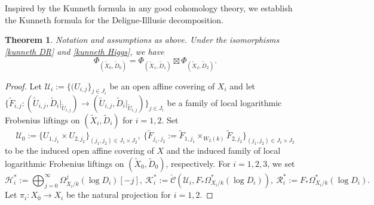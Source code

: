 \documentclass[12pt, a4paper]{article}
\newtheorem{theorem}{Theorem}[section]
\begin{document}
Inspired by the Kunneth formula in any good cohomology theory, we establish the Kunneth formula for the Deligne-Illlusie decomposition. 
\begin{theorem}
Notation and assumptions as above. Under the isomorphisms \eqref{kunneth DR} and \eqref{kunneth Higgs}, we have
$$
\Phi_{(\tilde X_0,\tilde D_0)}=\Phi_{(\tilde X_1,\tilde D_1)}\boxtimes\Phi_{(\tilde X_2,\tilde D_2)}.
$$
\end{theorem}
\begin{proof}
Let $\mathcal U_i:=\{(U_{i,j}\}_{j\in J_i}$ be an open affine covering of $X_i$ and let $\{\tilde F_{i,j}:(\tilde U_{i,j},\tilde D_i|_{\tilde U_{i,j}})\to(\tilde U_{i,j},\tilde D_i|_{\tilde U_{i,j}})\}_{j\in J_i}$ be a family of local logarithmic Frobenius liftings on $(\tilde X_i,\tilde D_i)$ for $i=1,2$. Set 
$$\mathcal U_0:=\{U_{1,j_1}\times U_{2,j_2}\}_{(j_1,j_2)\in J_1\times J_2},~\{\tilde F_{j_1,j_2}:=\tilde F_{1,j_1}\times_{W_2(k)}\tilde F_{2,j_2}\}_{(j_1,j_2)\in J_1\times J_2}
$$ to be the induced open affine covering of $X$ and  the induced family of local logarithmic Frobenius liftings on $(\tilde X_0,\tilde D_0)$, respectively.
For $i=1,2,3$, we set
$$
\mathcal H^*_i:=\bigoplus_{j=0}^\infty\Omega^j_{X_i/k}(\log D_i)[-j],~\mathcal K_i^*:=\check{\mathcal C}(\mathcal U_i,F_*\Omega^*_{X_i/k}(\log D_i)),~\mathcal R^*_i:=F_*\Omega^*_{X_i/k}(\log D_i).
$$
Let $\pi_i:X_0\to X_i$ be the natural projection for $i=1,2$. 


\end{proof}
\end{document}

